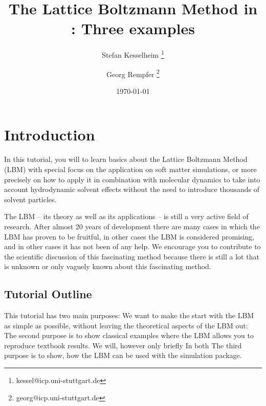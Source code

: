\renewcommand{\d}{\mathrm d}
\subject{ESPResSo Tutorial}
\title{The Lattice Boltzmann Method in \ES{}: Three examples } \author{ Stefan Kesselheim \thanks{\ttfamily 
kessel@icp.uni-stuttgart.de}  \and  Georg Rempfer \thanks{\ttfamily 
georg@icp.uni-stuttgart.de}}
\date{\today}
\publishers{Institute for Computational Physics, Stuttgart University}

\maketitle \tableofcontents


\chapter{Introduction}
In this tutorial, you will to learn basics about the 
Lattice Boltzmann Method (LBM) with special focus on the application
on soft matter simulations, or more precisely on how to apply it 
in combination with molecular dynamics to take into account 
hydrodynamic solvent effects without the need to introduce
thousands of solvent particles. 

The LBM -- its theory as well as its applications -- is 
still a very active field of research. After almost 20 years
of development there are many cases in which the LBM has proven
to be fruitful, in other cases the LBM is considered promising,
and in other cases it has not been of any help. We
encourage you to contribute to the scientific discussion 
of this fascinating method because there is still a lot 
that is unknown or only vaguely known about this fascinating
method. 

\section{Tutorial Outline}
This tutorial has two main purposes: We want to make the start
with the LBM as simple as possible, without leaving the theoretical
aspects of the LBM out:
The second purpose is to show classical examples where the LBM allows 
you to reproduce textbook results. We will, however only briefly 
In both 
The third purpose is to show, how the LBM can be used with the
\ES{} simulation package. 

